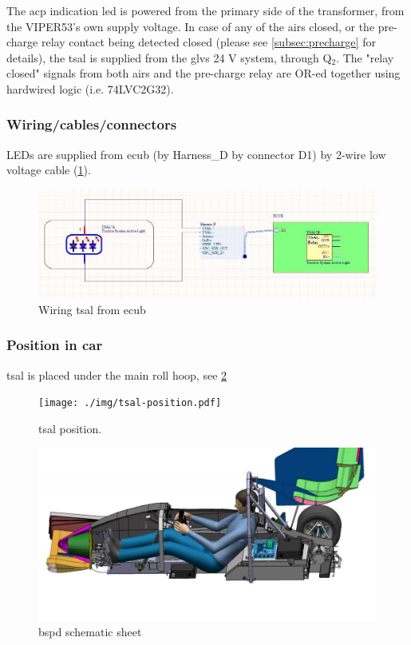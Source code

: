The \gls{acp} indication led is powered from the primary side of the transformer, from the VIPER53's own supply voltage.
In case of any of the \glspl{air} closed, or the pre-charge relay contact being detected closed (please see \ref{subsec:precharge}  for details), the \gls{tsal} is supplied from the \gls{glvs} 24 V system, through Q$_2$. The "relay closed" signals from both \glspl{air} and the pre-charge relay are OR-ed together using hardwired logic (i.e. 74LVC2G32).

\subsubsection{Wiring/cables/connectors}

LEDs are supplied from \gls{ecub} (by Harness\_D by connector D1) by 2-wire low voltage cable (\ref{fig:TSAL-wiring}).

\begin{figure}[H]
	\centering
	\includegraphics[width=\textwidth,]{./img/tsal-wiring.jpg}
	\caption{Wiring \gls{tsal} from \gls{ecub}}
	\label{fig:TSAL-wiring}
\end{figure}

\subsubsection{Position in car}
\gls{tsal} is placed under the main roll hoop, see \ref{fig:TSAL-position}

\begin{figure}[H]
	\centering
	\texttt{[image: ./img/tsal-position.pdf]}
	\caption{\Gls{tsal} position.}
	\label{fig:TSAL-position}
\end{figure}

\begin{figure}[H]
	\centering
	\includegraphics[width=\textwidth]{./img/ECUB_POSITION.jpg}
	\caption{\gls{bspd} schematic sheet}
	\label{fig:ecub_position}
\end{figure}

